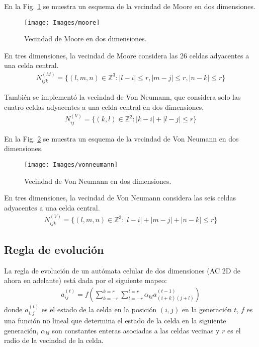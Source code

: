 En la Fig. \ref{fig:moore} se muestra un esquema de la vecindad de Moore en dos dimensiones.
\begin{figure}[H]
    \centering
    \texttt{[image: Images/moore]}
    \caption{Vecindad de Moore en dos dimensiones.}
    \label{fig:moore}
\end{figure}

En tres dimensiones, la vecindad de Moore considera las 26 celdas adyacentes a una celda central.
\begin{equation}
    \label{eq:moore_neighborhood_3d}
    \begin{aligned}
        N^{(M)}_{ijk} = \{(l,m,n) \in \mathbb{Z}^3 : |l-i| \leq r, |m-j| \leq r, |n-k| \leq r\}
    \end{aligned}
\end{equation}

También se implementó la vecindad de Von Neumann, que considera solo las cuatro celdas adyacentes a una celda central en dos dimensiones.
\begin{equation}
    \label{eq:von_neumann_neighborhood}
    \begin{aligned}
        N^{(V)}_{ij} = \{(k,l) \in \mathbb{Z}^2 : |k-i| + |l-j| \leq r\}
    \end{aligned}
\end{equation}

En la Fig. \ref{fig:vonneumann} se muestra un esquema de la vecindad de Von Neumann en dos dimensiones.
\begin{figure}[H]
    \centering
    \texttt{[image: Images/vonneumann]}
    \caption{Vecindad de Von Neumann en dos dimensiones.}
    \label{fig:vonneumann}
\end{figure}

En tres dimensiones, la vecindad de Von Neumann considera las seis celdas adyacentes a una celda central.
\begin{equation}
    \label{eq:von_neumann_neighborhood_3d}
    \begin{aligned}
        N^{(V)}_{ijk} = \{(l,m,n) \in \mathbb{Z}^3 : |l-i| + |m-j| + |n-k| \leq r\}
    \end{aligned}
\end{equation}


\subsection{Regla de evolución}
\label{subsec:evolucion}
La regla de evolución de un autómata celular de dos dimensiones (AC 2D de ahora en adelante) está dada por el siguiente mapeo:
\begin{equation}
    \label{eq:evolution_rule}
    \begin{aligned}
        a_{ij}^{(t)} = f(\sum^{k=r}_{k=-r}\sum^{l=r}_{l=-r}{\alpha_{kl}a_{(i+k)(j+l)}^{(t-1)}})
    \end{aligned}
\end{equation}
donde $a_{i,j}^{(t)}$ es el estado de la celda en la posición $(i,j)$ en la generación $t$, $f$ es una función no lineal que determina el estado de la celda en la siguiente generación, $\alpha_{kl}$ son constantes enteras asociadas a las celdas vecinas y $r$ es el radio de la vecindad de la celda.

